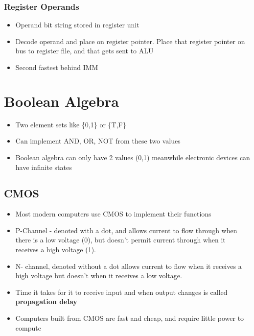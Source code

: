 \documentclass{article}
\begin{document}
 \subsubsection{Register Operands}

\begin{itemize}
    \item Operand bit string stored in register unit 
    \item Decode operand and place on register pointer. Place that register pointer on bus to register file, and that gets sent to ALU
    \item Second fastest behind IMM
\end{itemize}

\section{Boolean Algebra}

\begin{itemize}
    \item Two element sets like \{0,1\} or \{T,F\}
    
    \item Can implement AND, OR, NOT from these two values
    
    \item Boolean algebra can only have 2 values (0,1) meanwhile electronic devices can have infinite states
    
    
\end{itemize}

\subsection{CMOS}

\begin{itemize}
    \item Most modern computers use CMOS to implement their functions
    
    \item P-Channel - denoted with a dot, and allows current to flow through when there is a low voltage (0), but doesn't permit current through when it receives a high voltage (1).
    
    \item N- channel, denoted without a dot allows current to flow when it receives a high voltage but doesn't when it receives a low voltage.
    
    \item Time it takes for it to receive input and when output changes is called \textbf{propagation delay}
    
    \item Computers built from CMOS are fast and cheap, and require little power to compute
    
    \end{itemize}
\end{document}
